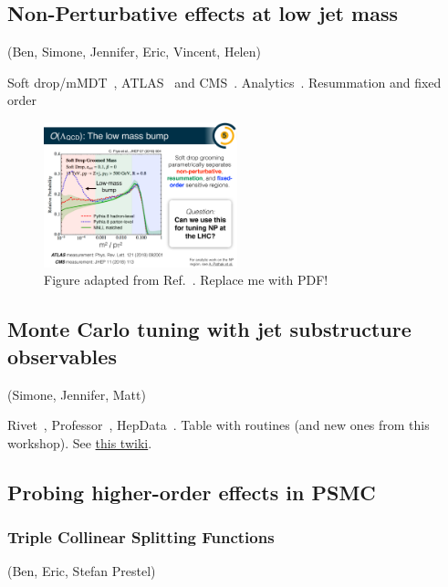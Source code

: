 \documentclass[11pt]{cernrep}
\begin{document}
\subsection{Non-Perturbative effects at low jet mass}
\label{sec:jets:np}
(Ben, Simone, Jennifer, Eric, Vincent, Helen)

Soft drop/mMDT~\cite{Larkoski:2014wba,Dasgupta:2013ihk}, ATLAS~\cite{Aaboud:2017qwh,Aad:2019vyi} and CMS~\cite{Sirunyan:2018xdh}.  Analytics~\cite{Hoang:2019ceu}.  Resummation and fixed order~\cite{Frye:2016aiz,Frye:2016okc,Marzani:2017mva,Marzani:2017kqd,Kang:2018vgn,Kang:2018jwa,Baron:2018nfz,Kardos:2018kth}

\begin{figure}[h!]
\centering
\includegraphics[width=0.5\textwidth]{figs/Lowmassbump.pdf}
\caption{Figure adapted from Ref.~\cite{Frye:2016aiz}.  Replace me with PDF!}
\label{fig:jets:np:illustration}
\end{figure}

\subsection{Monte Carlo tuning with jet substructure observables}
\label{sec:jets:mc}
(Simone, Jennifer, Matt)

Rivet~\cite{Buckley:2010ar}, Professor~\cite{Buckley:2009bj}, HepData~\cite{Buckley:2010jn,Maguire:2017ypu}.  Table with routines (and new ones from this workshop).  See \href{https://twiki.cern.ch/twiki/bin/view/LHCPhysics/LHCJetSubstructureMeasurements}{this twiki}.


\subsection{Probing higher-order effects in PSMC}
\label{sec:jets:psmc}

\subsubsection{Triple Collinear Splitting Functions}
(Ben, Eric, Stefan Prestel)
\end{document}
